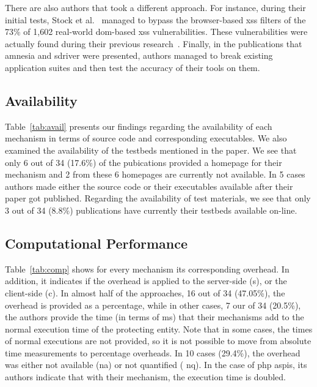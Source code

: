 \documentclass[conference]{IEEEtran}
\begin{document}
There are also authors that took a different approach.
For instance, during their initial tests,
Stock et al.~\cite{SLMS14} managed to bypass
the browser-based {\sc xss} filters of the
73\% of 1,602 real-world {\sc dom}-based {\sc xss} vulnerabilities.
These vulnerabilities were actually found during
their previous research~\cite{LSJ13}.
Finally, in the publications that
{\sc amnesia} and {\sc sd}river were presented,
authors managed to break existing application suites
and then test the accuracy of their tools on them.




\subsection{Availability}

Table~\ref{tab:avail} presents our findings regarding the availability
of each mechanism in terms of source code and corresponding
executables. We also examined the availability of the testbeds
mentioned in the paper. We see that only 6 out of 34 (17.6\%) of the
pubications provided a homepage for their mechanism and 2 from these 6
homepages are currently not available. In 5 cases authors made either
the source code or their executables available after their paper got
published. Regarding the availability of test materials, we see that
only 3 out of 34 (8.8\%) publications have currently their testbeds
available on-line.

\subsection{Computational Performance}

Table~\ref{tab:comp} shows for every mechanism its corresponding
overhead. In addition, it indicates if the overhead is applied to the
server-side ({\sc s}), or the client-side ({\sc c}). In almost half of
the approaches, 16 out of 34 (47.05\%), the overhead is provided as a
percentage, while in other cases, 7 our of 34 (20.5\%), the authors
provide the time (in terms of ms) that their mechanisms add to the
normal execution time of the protecting entity. Note that in some
cases, the times of normal executions are not provided,
so it is not possible to move from absolute
time measurements to percentage overheads. In 10 cases (29.4\%), the
overhead was either not available ({\sc na}) or not quantified ({\sc
  nq}). In the case of {\sc php aspis}, its authors indicate that with
their mechanism, the execution time is doubled.
\end{document}
